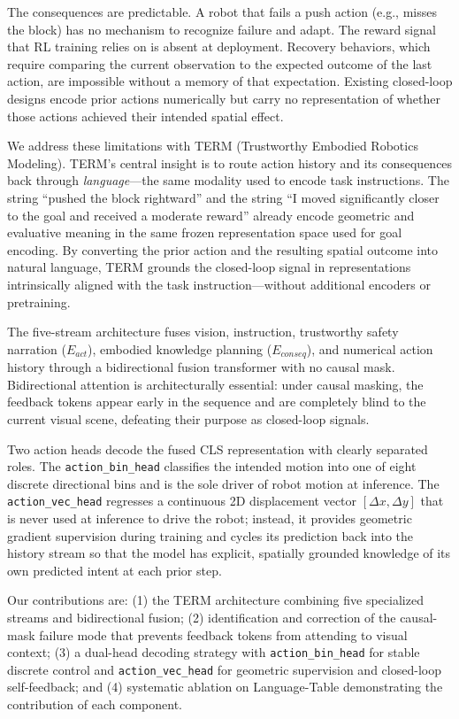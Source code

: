 \documentclass[letterpaper]{article} %
\begin{document}
The consequences are predictable. A robot that fails a push action (e.g., misses the block) has no mechanism to recognize failure and adapt. The reward signal that RL training relies on is absent at deployment. Recovery behaviors, which require comparing the current observation to the expected outcome of the last action, are impossible without a memory of that expectation. Existing closed-loop designs \cite{hejna2025pi05,durante2024agent} encode prior actions numerically but carry no representation of whether those actions achieved their intended spatial effect.

We address these limitations with TERM (Trustworthy Embodied Robotics Modeling). TERM's central insight is to route action history and its consequences back through \emph{language}---the same modality used to encode task instructions. The string ``pushed the block rightward'' and the string ``I moved significantly closer to the goal and received a moderate reward'' already encode geometric and evaluative meaning in the same frozen representation space used for goal encoding. By converting the prior action and the resulting spatial outcome into natural language, TERM grounds the closed-loop signal in representations intrinsically aligned with the task instruction---without additional encoders or pretraining.

The five-stream architecture fuses vision, instruction, trustworthy safety narration ($E_{act}$), embodied knowledge planning ($E_{conseq}$), and numerical action history through a bidirectional fusion transformer with no causal mask. Bidirectional attention is architecturally essential: under causal masking, the feedback tokens appear early in the sequence and are completely blind to the current visual scene, defeating their purpose as closed-loop signals.

Two action heads decode the fused CLS representation with clearly separated roles. The \texttt{action\_bin\_head} classifies the intended motion into one of eight discrete directional bins and is the sole driver of robot motion at inference. The \texttt{action\_vec\_head} regresses a continuous 2D displacement vector $[\Delta x, \Delta y]$ that is never used at inference to drive the robot; instead, it provides geometric gradient supervision during training and cycles its prediction back into the history stream so that the model has explicit, spatially grounded knowledge of its own predicted intent at each prior step.

Our contributions are: (1) the TERM architecture combining five specialized streams and bidirectional fusion; (2) identification and correction of the causal-mask failure mode that prevents feedback tokens from attending to visual context; (3) a dual-head decoding strategy with \texttt{action\_bin\_head} for stable discrete control and \texttt{action\_vec\_head} for geometric supervision and closed-loop self-feedback; and (4) systematic ablation on Language-Table demonstrating the contribution of each component.
\end{document}
